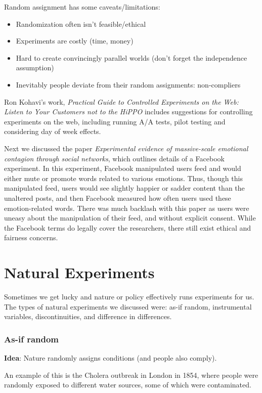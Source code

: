 Random assignment has some caveats/limitations:
\begin{itemize}
\item Randomization often isn't feasible/ethical
\item Experiments are costly (time, money)
\item Hard to create convincingly parallel worlds (don't forget the independence assumption)
\item Inevitably people deviate from their random assignments: non-compliers
\end{itemize}

Ron Kohavi's work, \textit{Practical Guide to Controlled Experiments on the Web: Listen to Your Customers not to the HiPPO} includes suggestions for controlling experiments on the web, including running A/A tests, pilot testing and considering day of week effects. 

Next we discussed the paper \textit{Experimental evidence of massive-scale emotional contagion through social networks}, which outlines details of a Facebook experiment.  In this experiment, Facebook manipulated users feed and would either mute or promote words related to various emotions.  Thus, though this manipulated feed, users would see slightly happier or sadder content than the unaltered posts, and then Facebook measured how often users used these emotion-related words.  There was much backlash with this paper as users were uneasy about the manipulation of their feed, and without explicit consent.  While the Facebook terms do legally cover the researchers, there still exist ethical and fairness concerns. 

\section{Natural Experiments}

Sometimes we get lucky and nature or policy effectively runs experiments for us.  The types of natural experiments we discussed were:
as-if random, instrumental variables, discontinuities, and difference in differences.


\subsubsection{As-if random}
\textbf{Idea}: Nature randomly assigns conditions (and people also comply).  

An example of this is the Cholera outbreak in London in 1854, where people were randomly exposed to different water sources, some of which were contaminated. 

